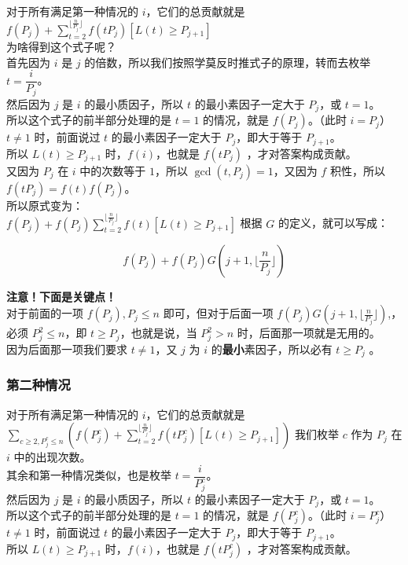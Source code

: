 \documentclass[
]{article}
\begin{document}
对于所有满足第一种情况的 \(i\)，它们的总贡献就是 \\
\(f(P_j)+\sum_{t=2}^{\lfloor\frac{n}{P_j}\rfloor}f(tP_j)[L(t)\ge P_{j+1}]\)
\\
为啥得到这个式子呢？\\
首先因为 \(i\) 是 \(j\)
的倍数，所以我们按照学莫反时推式子的原理，转而去枚举
\(t=\dfrac {i}{P_j}\)。\\
然后因为 \(j\) 是 \(i\) 的最小质因子，所以 \(t\) 的最小素因子一定大于
\(P_j\)，或 \(t=1\)。\\
所以这个式子的前半部分处理的是 \(t=1\) 的情况，就是 \(f(P_j)\)。（此时
\(i=P_j\)）\\
\(t\ne 1\) 时，前面说过 \(t\) 的最小素因子一定大于 \(P_j\)，即大于等于
\(P_{j+1}\)。\\
所以 \(L(t)\ge P_{j+1}\) 时，\(f(i)\)，也就是 \(f(tP_j)\)
，才对答案构成贡献。\\
又因为 \(P_j\) 在 \(i\) 中的次数等于 \(1\)，所以
\(\gcd(t,P_j)=1\)，又因为 \(f\) 积性，所以 \(f(tP_j)=f(t)f(P_j)\)。\\
所以原式变为：\\
\(f(P_j)+f(P_j)\sum_{t=2}^{\lfloor\frac{n}{P_j}\rfloor}f(t)[L(t)\ge P_{j+1}]\)
根据 \(G\) 的定义，就可以写成：

\[f(P_j)+f(P_j)G(j+1,\lfloor\frac{n}{P_j}\rfloor)\]

\textbf{注意！下面是关键点！}\\
对于前面的一项 \(f(P_j),P_j\le n\) 即可，但对于后面一项
\(f(P_j)G(j+1,\lfloor\frac{n}{P_j}\rfloor)\),，必须 \(P_j^2\le n\)，即
\(t\ge P_j\)，也就是说，当 \(P_j^2>n\) 时，后面那一项就是无用的。 \\
因为后面那一项我们要求 \(t\ne 1\)，又 \(j\) 为 \(i\)
的\textbf{最小}素因子，所以必有 \(t\ge  P_j\) 。

\subsubsection{\texorpdfstring{第二种情况
}{第二种情况 }}\label{ux7b2cux4e8cux79cdux60c5ux51b5}

对于所有满足第一种情况的 \(i\)，它们的总贡献就是 \\
\(\sum_{c\ge2,P_j^c\le n}(f(P_j^c)+\sum_{t=2}^{\lfloor\frac{n}{P_j^c}\rfloor}f(tP_j^c)[L(t)\ge P_{j+1}])\)
我们枚举 \(c\) 作为 \(P_j\) 在 \(i\) 中的出现次数。\\
其余和第一种情况类似，也是枚举 \(t=\dfrac{i}{P_j^c}\)。\\
然后因为 \(j\) 是 \(i\) 的最小质因子，所以 \(t\) 的最小素因子一定大于
\(P_j\)，或 \(t=1\)。\\
所以这个式子的前半部分处理的是 \(t=1\) 的情况，就是 \(f(P_j^c)\)。（此时
\(i=P_j^c\)）\\
\(t\ne 1\) 时，前面说过 \(t\) 的最小素因子一定大于 \(P_j\)，即大于等于
\(P_{j+1}\)。\\
所以 \(L(t)\ge P_{j+1}\) 时，\(f(i)\)，也就是 \(f(tP_j^c)\)
，才对答案构成贡献。
\end{document}
